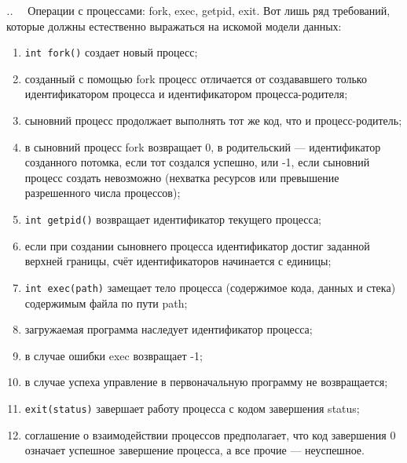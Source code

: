 \documentclass[14pt, twoside]{extreport}
\newcounter{problem_type}[chapter]
\newcounter{zadacha}[problem_type]
\newcommand{\z}{\vspace{0.5cm}\par\addtocounter{zadacha}{1}%
\textit{\arabic{chapter}.\arabic{problem_type}.\arabic{zadacha}}~~  }
\begin{document}
\z Операции с процессами: fork, exec, getpid, exit. Вот лишь ряд требований, которые должны естественно выражаться на искомой модели данных:
\begin{enumerate}
  \item \texttt{int fork()} создает новый процесс;
  \item созданный с помощью fork процесс отличается от создававшего только идентификатором процесса и идентификатором процесса-родителя;
  \item сыновний процесс продолжает выполнять тот же код, что и процесс-родитель;
  \item в сыновний процесс fork возвращает 0, в родительский --- идентификатор созданного потомка, если тот создался успешно, или -1, если сыновний процесс создать невозможно (нехватка ресурсов или превышение разрешенного числа процессов);
  \item \texttt{int getpid()} возвращает идентификатор текущего процесса;
  \item если при создании сыновнего процесса идентификатор достиг заданной верхней границы, счёт идентификаторов начинается с единицы;
  \item \texttt{int exec(path)} замещает тело процесса (содержимое кода, данных и стека) содержимым файла по пути path;
  \item загружаемая программа наследует идентификатор процесса;
  \item в случае ошибки exec возвращает -1;
  \item в случае успеха управление в первоначальную программу не возвращается;
  \item \texttt{exit(status)} завершает работу процесса с кодом завершения status;
  \item соглашение о взаимодействии процессов предполагает, что код завершения 0 означает успешное завершение процесса, а все прочие --- неуспешное.
\end{enumerate}
\end{document}
